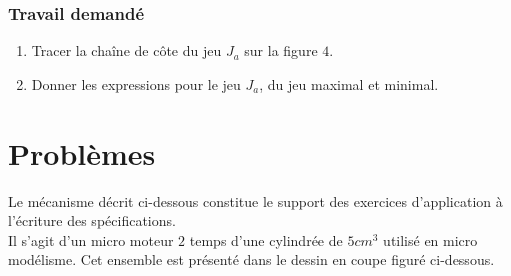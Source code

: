 \subsubsection{Travail demandé}
\begin{enumerate}
\item Tracer la chaîne de côte du jeu $J_a$ sur la figure $4$.
\item Donner les expressions pour le jeu $J_a$, du jeu maximal et minimal.
\end{enumerate}

\newpage


\section{Problèmes}

Le mécanisme décrit ci-dessous constitue le support des exercices d'application à l'écriture des spécifications.\\
Il s'agit d'un micro moteur $2$ temps d'une cylindrée de $5 cm^3$ utilisé en micro modélisme. Cet ensemble est présenté dans le dessin en coupe figuré ci-dessous.

